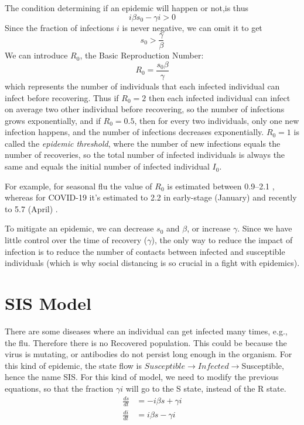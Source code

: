 The condition determining if an epidemic will happen or not,is thus
\begin{equation}
i \beta s_0 - \gamma i > 0
\end{equation}
Since the fraction of infections $i$ is never negative, we can omit it to get
\begin{equation}
s_0 > \frac{\gamma}{\beta}
\end{equation}
We can introduce $R_0$, the Basic Reproduction Number:
\begin{equation}
R_0 = \frac{s_0 \beta}{\gamma}
\end{equation}
which represents the number of individuals that each infected individual can infect before recovering. Thus if $R_0 = 2$ then each infected individual can infect on average two other individual before recovering, so the number of infections grows exponentially, and if $R_0 = 0.5$, then for every two individuals, only one new infection happens, and the number of infections decreases exponentially. $R_0 = 1$ is called the \textit{epidemic threshold}, where the number of new infections equals the number of recoveries, so the total number of infected individuals is always the same and equals the initial number of infected individual $I_0$. 

For example, for seasonal flu the value of $R_0$ is estimated between 0.9–2.1 \cite{coburn2009modeling}, whereas for COVID-19 it's estimated to 2.2 in early-stage (January) \cite{li2020early} and recently to 5.7 (April) \cite{readeid}.

To mitigate an epidemic, we can decrease $s_0$ and $\beta$, or increase $\gamma$. Since we have little control over the time of recovery ($\gamma$), the only way to reduce the impact of infection is to reduce the number of contacts between infected and susceptible individuals (which is why social distancing is so crucial in a fight with epidemics).


\section{SIS Model}
There are some diseases where an individual can get infected many times, e.g., the flu. Therefore there is no Recovered population. This could be because the virus is mutating, or antibodies do not persist long enough in the organism. For this kind of epidemic, the state flow is $Susceptible → Infected → $Susceptible, hence the name SIS. 
For this kind of model, we need to modify the previous equations, so that the fraction $\gamma i$ will go to the S state, instead of the R state.
\begin{equation}
\begin{split} \label{eq_sis}
\frac{ds}{dt} &= - i \beta s + \gamma i \\
\frac{di}{dt} &= i \beta s - \gamma i
\end{split}
\end{equation}


